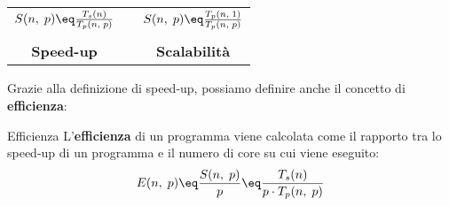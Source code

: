 \begin{center}
    \begin{tabular}{c c c}
        $S(n, \; p) \eq \frac{T_s(n)}{T_p(n, \; p)}$ & \quad \quad \quad \quad & $S(n, \; p) \eq \frac{T_p(n, \; 1)}{T_p(n, \; p)}$ \\ & & \\
        \textbf{Speed-up} & & \textbf{Scalabilità}
    \end{tabular}
\end{center}

Grazie alla definizione di speed-up, possiamo definire anche il concetto di \textbf{efficienza}:

\begin{definition}{Efficienza}
    L'\textbf{efficienza} di un programma viene calcolata come il rapporto tra lo speed-up di un programma e il numero di core su cui viene eseguito:
    \[ E(n, \; p) \eq \frac{S(n, \; p)}{p} \eq \frac{T_s(n)}{p \cdot T_p(n, \; p)} \]
\end{definition}